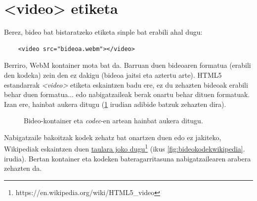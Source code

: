 \section{<video> etiketa}

Berez, bideo bat bistaratzeko etiketa sinple bat erabili ahal dugu:

\begin{verbatim}
    <video src="bideoa.webm"></video>
\end{verbatim}

Berriro, WebM kontainer mota bat da. Barruan duen bideoaren formatua (erabili den kodeka) zein den ez dakigu (bideoa jaitsi eta aztertu arte). HTML5 estandarrak \textit{<video>} etiketa eskaintzen badu ere, ez du zehazten bideoak erabili behar duen formatua... edo nabigatzaileak berak onartu behar dituen formatuak. Izan ere, hainbat aukera ditugu (\ref{fig:bideokodek} irudian adibide batzuk zehazten dira).

\begin{figure}[ht]
	\centering
{}
\caption{Bideo-kontainer eta \textit{codec}-en artean hainbat aukera ditugu.}
\label{fig:bideokodek}
\end{figure}

Nabigatzaile bakoitzak kodek zehatz bat onartzen duen edo ez jakiteko, Wikipediak eskaintzen duen \href{https://en.wikipedia.org/wiki/HTML5_video}{taulara joko dugu}\footnote{https://en.wikipedia.org/wiki/HTML5\_video} (ikus \ref{fig:bideokodekwikipedia}. irudia). Bertan kontainer eta kodeken bateragarritasuna nabigatzailearen arabera zehazten da.



